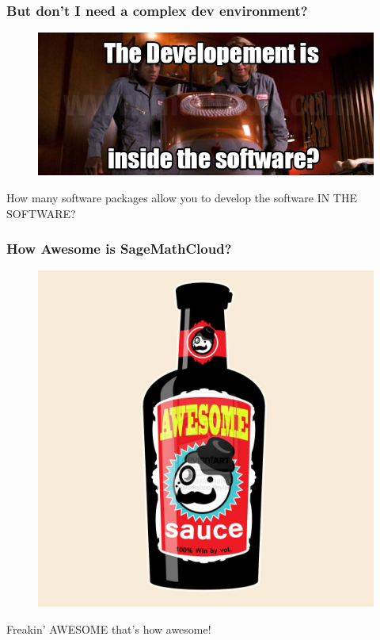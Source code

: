 \documentclass[xcolor=dvipsnames]{beamer}
\begin{document}
\begin{frame}

\frametitle{But don't I need a complex dev environment?}

\begin{figure}[H]
    \centering
        \includegraphics[width=1\textwidth]{zoolander}
\end{figure}

How many software packages allow you to develop the software IN THE SOFTWARE?

\end{frame}

\begin{frame}

\frametitle{How Awesome is SageMathCloud?}

\begin{figure}[H]
    \centering
        \includegraphics[width=.55\textwidth]{awesomesauce}
\end{figure}

\centerline{Freakin' AWESOME that's how awesome!}



\end{frame}
\end{document}
